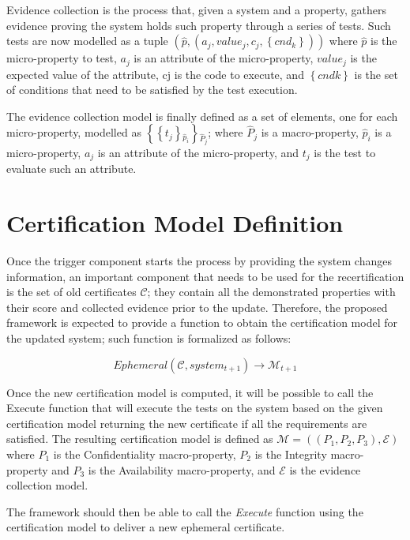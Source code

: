 Evidence collection is the process that, given a system and a property, gathers evidence proving the system holds such property through a series of tests. Such tests are now modelled as a tuple \( \left ( \hat{p}, \left (a_j, value_j, c_j, \left \{ cnd_k \right \} \right ) \right ) \)  where \( \hat{p} \) is the micro-property to test, \(a_j\) is an attribute of the micro-property, 
\(value_j\) is the expected value of the attribute, cj is the code to execute, and \( \left \{ cndk \right \} \) is the set of conditions that need to be satisfied by the test execution.

The evidence collection model is finally defined as a set of elements, one for each micro-property, modelled as \(  \left \{ \left \{ t_j \right \} {_{\hat{p}_i}} \right \} {_{\hat{P}_j}} \); where \( \hat{P}_j \) is a macro-property,  \( \hat{p}_i \) is a micro-property, \(a_j\) is an attribute of the micro-property, and \(t_j\) is the test to evaluate such an attribute.


\section{Certification Model Definition}
Once the trigger component starts the process by providing the system changes information, an important component that needs to be used for the recertification is the set of old certificates \(\mathcal{C}\); they contain all the demonstrated properties with their score and collected evidence prior to the update. Therefore, the proposed framework is expected to provide a function to obtain the certification model for the updated system; such function is formalized as follows:

\[Ephemeral(\mathcal{C}, system_{t+1}) \rightarrow {\mathcal{M}}_{t+1} \]


Once the new certification model is computed, it will be possible to call the Execute function that will execute the tests on the system based on the given certification model returning the new certificate if all the requirements are satisfied. The resulting certification model is defined as 
\(\mathcal{M} = \left ( \left ( P_1, P_2, P_3 \right ), \mathcal{E} \right )\) where \(P_1\) is the Confidentiality macro-property, \(P_2\) is the Integrity macro-property and \(P_3\) is the Availability macro-property, and \( \mathcal{E} \) is the evidence collection model.
 
The framework should then be able to call the \textit{Execute} function using the certification model to deliver a new ephemeral certificate.

